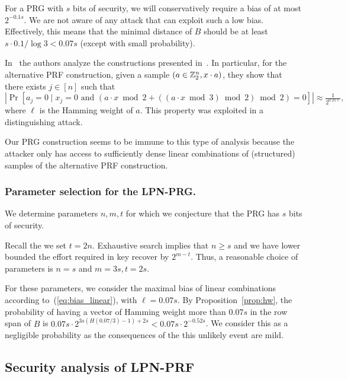 For a PRG with $s$ bits of security, we will conservatively require a bias of at most $2^{-0.1 s}$.
We are not aware of any attack that can exploit such a low bias.
Effectively, this means that the minimal distance of $B$ should be
at least $s \cdot 0.1/\log 3 < 0.07 s$ (except with small probability).


\begin{remark}
In~\cite{CheonCKK20} the authors analyze the constructions presented in~\cite{boneh2018-darkmatter}.
In particular, for the alternative PRF construction,
given a sample $(a \in \mathbb{Z}_2^n, x \cdot a)$,
they show that there exists $j \in [n]$ such that
$$|\Pr[a_j = 0 \mid x_j = 0 \text{ and } (a \cdot x \bmod 2 + ((a \cdot x \bmod 3) \bmod 2) \bmod 2) = 0]| \approx \tfrac{1}{2^{0.21 \ell}},$$
where $\ell$ is the Hamming weight of $a$.
This property was exploited in a distinguishing attack.

Our PRG construction seems to be immune to this type of analysis
because the attacker only has access to sufficiently dense linear combinations of (structured) samples
of the alternative PRF construction.
\end{remark}


\subsubsection{Parameter selection for the LPN-PRG.}

We determine parameters $n,m,t$ for which
we conjecture that the
PRG has $s$ bits of security.

Recall the we set $t = 2n$.
Exhaustive search implies that $n \geq s$ and we have lower
bounded the effort required in key recover by $2^{m - t}$.
Thus, a reasonable choice of parameters is $n = s$ and $m = 3s, t = 2s$.

For these parameters, we consider the maximal bias of linear combinations according to~(\ref{eq:bias_linear}),
with $\ell = 0.07 s$.
By Proposition~\ref{prop:hw},
the probability of having a vector of Hamming weight more than $0.07 s$
in the row span of $B$ is
$0.07 s \cdot 2^{3s (H(0.07/3) - 1) + 2s} < 0.07 s \cdot 2^{-0.52 s}$.
We consider this as a negligible probability
as the consequences of the this unlikely event are mild.


\subsection{Security analysis of LPN-PRF}

